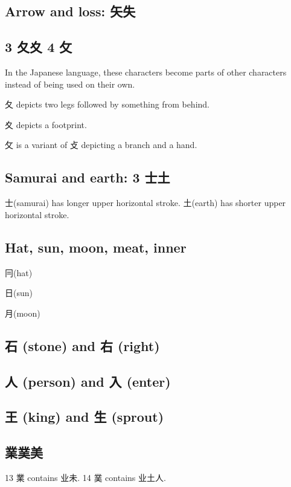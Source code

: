 \subsection{Arrow and loss: 矢失}

\subsection{3 夂夊 4 攵}

In the Japanese language,
these characters become parts of other characters
instead of being used on their own.

夂 depicts two legs followed by something from behind.

夊 depicts a footprint.

攵 is a variant of 攴 depicting a branch and a hand.

\subsection{Samurai and earth: 3 士土}

士(samurai) has longer upper horizontal stroke.
土(earth) has shorter upper horizontal stroke.

\subsection{Hat, sun, moon, meat, inner}

冃(hat)

日(sun)

月(moon)

\subsection{石 (stone) and 右 (right)}

\subsection{人 (person) and 入 (enter)}

\subsection{王 (king) and 生 (sprout)}

\subsection{業菐美}

13 業 contains 业未.
14 菐 contains 业土人.

